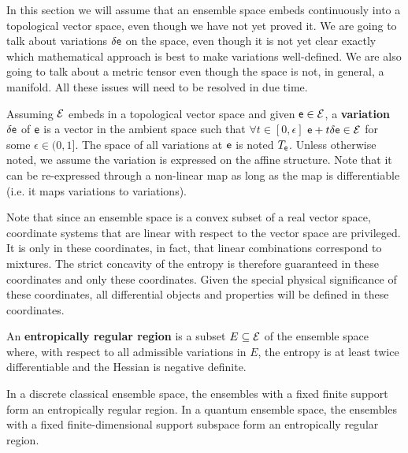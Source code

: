 \begin{mathSection}
\begin{remark}
	In this section we will assume that an ensemble space embeds continuously into a topological vector space, even though we have not yet proved it. We are going to talk about variations $\delta \mathsf{e}$ on the space, even though it is not yet clear exactly which mathematical approach is best to make variations well-defined. We are also going to talk about a metric tensor even though the space is not, in general, a manifold. All these issues will need to be resolved in due time.
\end{remark}

\begin{defn}
	Assuming $\mathcal{E}$ embeds in a topological vector space and given $\mathsf{e} \in \mathcal{E}$, a \textbf{variation} $\delta \mathsf{e}$ of $\mathsf{e}$ is a vector in the ambient space such that $\forall t \in [0,\epsilon]$ $\mathsf{e} + t \delta \mathsf{e} \in \mathcal{E}$ for some $\epsilon \in (0,1]$. The space of all variations at $\mathsf{e}$ is noted $T_{\mathsf{e}}$. Unless otherwise noted, we assume the variation is expressed on the affine structure. Note that it can be re-expressed through a non-linear map as long as the map is differentiable (i.e. it maps variations to variations).
\end{defn}

\begin{remark}
	Note that since an ensemble space is a convex subset of a real vector space, coordinate systems that are linear with respect to the vector space are privileged. It is only in these coordinates, in fact, that linear combinations correspond to mixtures. The strict concavity of the entropy is therefore guaranteed in these coordinates and only these coordinates. Given the special physical significance of these coordinates, all differential objects and properties will be defined in these coordinates.
\end{remark}
	
\begin{defn}
	An \textbf{entropically regular region} is a subset $E \subseteq \mathcal{E}$ of the ensemble space where, with respect to all admissible variations in $E$, the entropy is at least twice differentiable and the Hessian is negative definite.
\end{defn}

\begin{prop}
	In a discrete classical ensemble space, the ensembles with a fixed finite support form an entropically regular region. In a quantum ensemble space, the ensembles with a fixed finite-dimensional support subspace form an entropically regular region.
\end{prop}


\end{mathSection}
